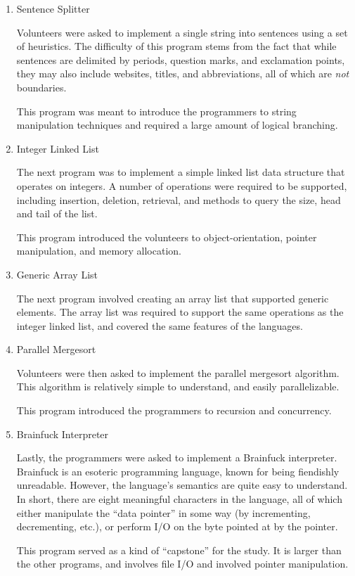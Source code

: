 \documentclass[draftcopy,nolof,nolot]{srpaper}
\begin{document}
\begin{enumerate}

\item Sentence Splitter

Volunteers were asked to implement a single string into sentences using a set
of heuristics. The difficulty of this program stems from the fact that
while sentences are delimited by periods, question marks, and exclamation
points, they may also include websites, titles, and abbreviations, all of
which are \textit{not} boundaries.

This program was meant to introduce the programmers to string manipulation
techniques and required a large amount of logical branching.

\item Integer Linked List

The next program was to implement a simple linked list data structure that
operates on integers. A number of operations were required to be supported,
including insertion, deletion, retrieval, and methods to query the size, head
and tail of the list.

This program introduced the volunteers to object-orientation, pointer
manipulation, and memory allocation.

\item Generic Array List

The next program involved creating an array list that supported generic
elements. The array list was required to support the same operations as the
integer linked list, and covered the same features of the languages.

\item Parallel Mergesort

Volunteers were then asked to implement the parallel mergesort algorithm. This
algorithm is relatively simple to understand, and easily parallelizable.

This program introduced the programmers to recursion and concurrency.

\item Brainfuck Interpreter

Lastly, the programmers were asked to implement a Brainfuck interpreter.
Brainfuck is an esoteric programming language, known for being fiendishly
unreadable. However, the language's semantics are quite easy to understand. In
short, there are eight meaningful characters in the language, all of which
either manipulate the ``data pointer'' in some way (by incrementing,
decrementing, etc.), or perform I/O on the byte pointed at by the pointer.

This program served as a kind of ``capstone'' for the study. It is larger than
the other programs, and involves file I/O and involved pointer manipulation.

\end{enumerate}
\end{document}
